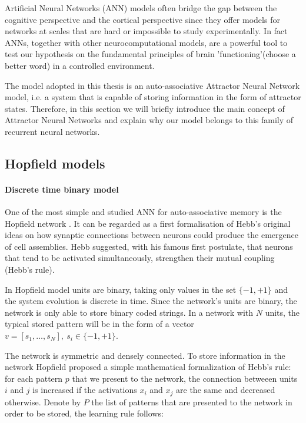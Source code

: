 
Artificial Neural Networks (ANN) models often bridge the gap between the cognitive perspective and the cortical perspective since they offer models for networks at scales that are hard or impossible to study experimentally. In fact ANNs, together with other neurocomputational models, are a powerful tool to test our hypothesis on the fundamental principles of brain 'functioning'(choose a better word) in a controlled environment. 

The model adopted in this thesis is an auto-associative Attractor Neural Network model, i.e. a system that is capable of storing information in the form of attractor states. Therefore, in  this section we will briefly introduce the main concept of Attractor Neural Networks and explain why our model belongs to this family of recurrent neural networks.

\subsection{Hopfield models}
\paragraph{Discrete time binary model}
One of the most simple and studied ANN for auto-associative memory is the Hopfield network \cite{hopfield1982neural}. It can be regarded as a first formalisation of Hebb's original ideas \cite{Hebb} on how synaptic connections between neurons could produce the emergence of cell assemblies. Hebb suggested, with his famous first postulate, that neurons that tend to be activated simultaneously, strengthen their mutual coupling (Hebb's rule). 

In Hopfield model units are binary, taking only values in the set $\{-1, +1\}$ and the system evolution is discrete in time. Since the network's units are binary, the network is only able to store binary coded strings. In a network with $N$ units, the typical stored pattern will be in the form of a vector $v = [s_1, \dots, s_N],\ s_i \in \{-1, +1\}$. 

The network is symmetric and densely connected. To store information in the network Hopfield proposed a simple mathematical formalization of Hebb's rule: for each pattern $p$ that we present to the network, the connection betweeen units $i$ and $j$ is increased if the activations $x_i$ and $x_j$ are the same and decreased otherwise. Denote by $P$ the list of patterns that are presented to the network in order to be stored, the learning rule follows:

